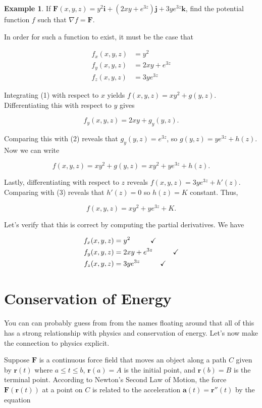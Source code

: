 \documentclass[11pt,oneside,english]{amsart}
\theoremstyle{definition}
\newtheorem*{example}{Example}
\newcommand{\pspace}{\hspace{10mm}}
\begin{document}
\begin{example}
If $\mathbf{F}(x,y,z)=y^2\mathbf{i}+(2xy+e^{3z})\mathbf{j}+3ye^{3z}\mathbf{k}$, find the potential function $f$ such that $\nabla f=\mathbf{F}$.

In order for such a function to exist, it must be the case that

\begin{align}
f_x(x,y,z)&=y^2\\
f_y(x,y,z)&=2xy+e^{3z}\\
f_z(x,y,z)&=3ye^{3z}
\end{align}

Integrating (1) with respect to $x$ yields $f(x,y,z)=xy^2+g(y,z)$. Differentiating this with respect to $y$ gives

\[
f_y(x,y,z)=2xy+g_y(y,z).
\]

Comparing this with (2) reveals that $g_y(y,z)=e^{3z}$, so $g(y,z)=ye^{3z}+h(z)$. Now we can write

\[
f(x,y,z)=xy^2+g(y,z)=xy^2+ye^{3z}+h(z).
\]

Lastly, differentiating with respect to $z$ reveals $f(x,y,z)=3ye^{3z}+h'(z)$. Comparing with (3) reveals that $h'(z)=0$ so $h(z)=K$  constant. Thus,

\[
f(x,y,z)=xy^2+ye^{3z}+K.
\]

Let's verify that this is correct by computing the partial derivatives. We have

\begin{align*}
f_x(x,y,z)&=y^2\pspace\checkmark\\
f_y(x,y,z)&=2xy+e^{3z}\pspace\checkmark\\
f_z(x,y,z)&=3ye^{3z}\pspace\checkmark
\end{align*}
\end{example}

\vfill
\pagebreak

\section*{Conservation of Energy}

You can can probably guess from from the names floating around that all of this has a strong relationship with physics and conservation of energy. Let's now make the connection to physics explicit.

Suppose $\mathbf{F}$ is a continuous force field that moves an object along a path $C$ given by $\mathbf{r}(t)$ where $a\leq t\leq b$, $\mathbf{r}(a)=A$ is the initial point, and $\mathbf{r}(b)=B$ is the terminal point. According to Newton's Second Law of Motion, the force $\mathbf{F}(\mathbf{r}(t))$ at a point on $C$ is related to the acceleration $\mathbf{a}(t)=\mathbf{r}''(t)$ by the equation
\end{document}
